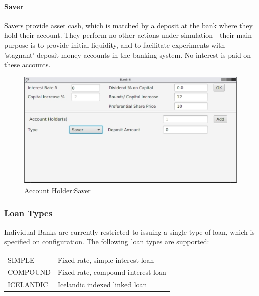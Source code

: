\documentclass[10pt,oneside,openright, a4paper]{memoir}
\begin{document}
\paragraph{Saver}   
Savers provide asset cash, which is matched by a deposit at the bank
where they hold their account. They perform no other actions under
simulation - their main purpose is to provide initial liquidity, and
to facilitate experiments with 'stagnant' deposit money accounts in the banking
system. No interest is paid on these accounts.
\begin{figure}[h]
\begin{center}
\includegraphics[width=14cm]{images/fig_saver.eps}
\caption{Account Holder:Saver}
\label{fig:saver}
\end{center}
\end{figure}

\subsubsection{Loan Types}
Individual Banks are currently restricted to issuing a single type of
loan, which is specified on configuration. The following loan types
are supported:
\begin{table}[ht]
\centering
\begin{tabular}{ll}
SIMPLE    & Fixed rate, simple interest loan   \\
COMPOUND  & Fixed rate, compound interest loan \\
ICELANDIC & Icelandic indexed linked loan      \\
\end{tabular}
\end{table}
\end{document}
